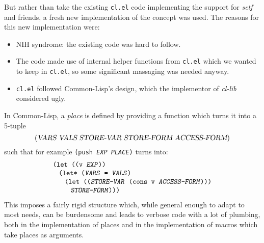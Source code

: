 \documentclass[format=acmsmall, review=false, screen=true]{acmart}
\makeatletter
\newcommand \MAlign [1] {\begin{array}{@{}l@{}}#1\end{array}}
\makeatother
\begin{document}
But rather than take the existing \texttt{cl.el} code implementing the
support for \emph{setf} and friends, a fresh new implementation of the
concept was used.  The reasons for this new implementation were:
\begin{itemize}
\item NIH syndrome: the existing code was hard to follow.
\item The code made use of internal helper functions from \texttt{cl.el}
  which we wanted to keep in \texttt{cl.el}, so some significant massaging
  was needed anyway.
\item \texttt{cl.el} followed Common-Lisp's design, which the implementor of
  \emph{cl-lib} considered ugly.
\end{itemize}
In Common-Lisp, a \emph{place} is defined by providing a function which
turns it into a 5-tuple
\begin{displaymath}
  (\textsl{VARS}~\textsl{VALS}~\textsl{STORE-VAR}~\textsl{STORE-FORM}
  ~\textsl{ACCESS-FORM})
\end{displaymath}
such that for example \texttt{(push \textsl{EXP} \textsl{PLACE})} turns into:
\begin{displaymath}
  \MAlign{
    \texttt{(let ((v \textsl{EXP}))} \\
    \;\;\;\MAlign{
      \texttt{(let* (\textsl{VARS} = \textsl{VALS})} \\
      \;\;\;\MAlign{
        \texttt{(let ((\textsl{STORE-VAR} (cons v \textsl{ACCESS-FORM})))} \\
        \;\;\;\texttt{\textsl{STORE-FORM})))}}}}
\end{displaymath}
This imposes a fairly rigid structure which, while general enough to adapt
to most needs, can be burdensome and leads to verbose code with a lot
of plumbing, both in the implementation of places and in the implementation
of macros which take places as arguments.
\end{document}
